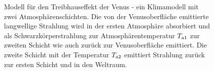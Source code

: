 \begin{figure}
\caption{\label{fig_Klima4}%
Modell f\"ur den Treibhauseffekt der Venus - ein Klimamodell mit zwei Atmosph\"arenschichten. 
Die von der Venusoberfl\"ache
emittierte langwellige Strahlung wird in der ersten Atmosph\"are absorbiert und als
Schwarzk\"orperstrahlung zur Atmosph\"arentemperatur $T_{\rm a1}$ zur zweiten Schicht wie
auch zur\"uck zur Venusoberfl\"ache emittiert. Die zweite Schicht mit der Temperatur
$T_{\rm a2}$ emittiert Strahlung zur\"uck zur ersten Schicht und in den Weltraum.}
\end{figure}

